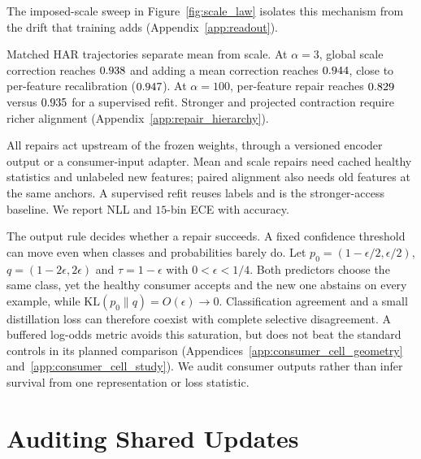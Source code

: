 \documentclass{article}
\begin{document}
The imposed-scale sweep in Figure~\ref{fig:scale_law} isolates this mechanism from the drift that training adds (Appendix~\ref{app:readout}).

Matched HAR trajectories separate mean from scale. At $\alpha=3$, global
scale correction reaches $0.938$ and adding a mean correction
reaches $0.944$, close to per-feature recalibration
($0.947$). At $\alpha=100$, per-feature repair reaches
$0.829$ versus $0.935$ for a supervised refit.
Stronger and projected contraction require richer alignment
(Appendix~\ref{app:repair_hierarchy}).

All repairs act upstream of the frozen weights, through a versioned encoder output or a consumer-input adapter. Mean and scale repairs need cached healthy statistics and unlabeled new features; paired alignment also needs old features at the same anchors. A supervised refit reuses labels and is the stronger-access baseline. We report NLL and $15$-bin ECE with accuracy.

The output rule decides whether a repair succeeds. A fixed confidence threshold can move even when classes and probabilities barely do. Let
$p_0=(1-\epsilon/2,\epsilon/2)$, $q=(1-2\epsilon,2\epsilon)$ and
$\tau=1-\epsilon$ with $0<\epsilon<1/4$. Both predictors choose the same
class, yet the healthy consumer accepts and the new one abstains on every
example, while $\mathrm{KL}(p_0\|q)=O(\epsilon)\to0$.
Classification agreement and a small distillation loss can therefore coexist
with complete selective disagreement. A buffered log-odds metric avoids
this saturation, but does not beat the standard controls in its planned
comparison (Appendices~\ref{app:consumer_cell_geometry}
and~\ref{app:consumer_cell_study}). We audit consumer outputs rather
than infer survival from one representation or loss statistic.

\section{Auditing Shared Updates}\label{sec:theory}\label{sec:diagnosis}
\end{document}
